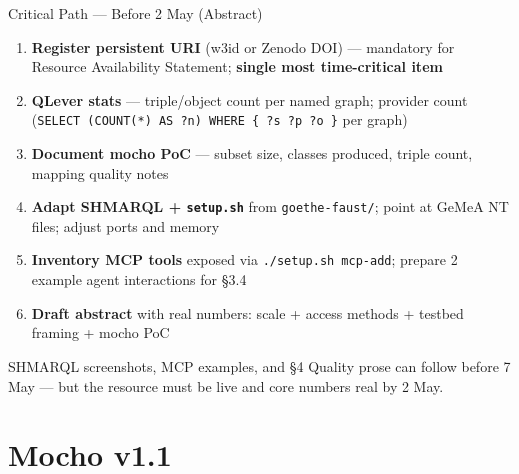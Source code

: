 \documentclass[xcolor,aspectratio=169,compress]{beamer}
\begin{document}
\begin{frame}{Critical Path --- Before 2 May (Abstract)}
  \small
  \begin{enumerate}\setlength{\itemsep}{5pt}
    \item \textbf{Register persistent URI} (w3id or Zenodo DOI) ---
          mandatory for Resource Availability Statement; \textbf{single most time-critical item}

    \item \textbf{QLever stats} ---
          triple/object count per named graph; provider count
          (\texttt{SELECT (COUNT(*) AS ?n) WHERE \{ ?s ?p ?o \}} per graph)

    \item \textbf{Document mocho PoC} ---
          subset size, classes produced, triple count, mapping quality notes

    \item \textbf{Adapt SHMARQL + \texttt{setup.sh}} from \texttt{goethe-faust/};
          point at GeMeA NT files; adjust ports and memory

    \item \textbf{Inventory MCP tools} exposed via \texttt{./setup.sh mcp-add};
          prepare 2 example agent interactions for §3.4

    \item \textbf{Draft abstract} with real numbers:
          scale + access methods + testbed framing + mocho PoC
  \end{enumerate}
  \begin{alertblock}{}
    \small SHMARQL screenshots, MCP examples, and §4 Quality prose can follow before 7 May ---
    but the resource must be live and core numbers real by 2 May.
  \end{alertblock}
\end{frame}


\section{Mocho v1.1}
\end{document}
